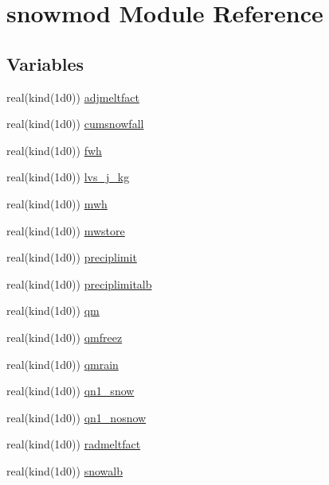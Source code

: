 \hypertarget{namespacesnowmod}{}\section{snowmod Module Reference}
\label{namespacesnowmod}
\subsection*{Variables}
\begin{DoxyCompactItemize}
\item 
real(kind(1d0)) \hyperlink{namespacesnowmod_a5c337bba47f88549ed03afb42d5d097d}{adjmeltfact}
\item 
real(kind(1d0)) \hyperlink{namespacesnowmod_a78e0393f653cfdebf0ccab83abc0b800}{cumsnowfall}
\item 
real(kind(1d0)) \hyperlink{namespacesnowmod_a67018a3202a62ad0d4e7715dbfcf5e50}{fwh}
\item 
real(kind(1d0)) \hyperlink{namespacesnowmod_aa988f82274f056c6d2f7ed3d37457b24}{lvs\+\_\+j\+\_\+kg}
\item 
real(kind(1d0)) \hyperlink{namespacesnowmod_a7e8123e5b32bedfb676ea5c6ca62272a}{mwh}
\item 
real(kind(1d0)) \hyperlink{namespacesnowmod_affe56e4e5f1d5df5d7f4bbae7ae22541}{mwstore}
\item 
real(kind(1d0)) \hyperlink{namespacesnowmod_a9e24791cb966600bc8e20739bc1f36b3}{preciplimit}
\item 
real(kind(1d0)) \hyperlink{namespacesnowmod_a5dcda7794eeea3753a3f14cd6fdf47b8}{preciplimitalb}
\item 
real(kind(1d0)) \hyperlink{namespacesnowmod_a1d7e7d0b8974783e0320cde393e09594}{qm}
\item 
real(kind(1d0)) \hyperlink{namespacesnowmod_adbb58215814d438f2486f880958737be}{qmfreez}
\item 
real(kind(1d0)) \hyperlink{namespacesnowmod_a35fe883b6ebd9767f44c27354160afd3}{qmrain}
\item 
real(kind(1d0)) \hyperlink{namespacesnowmod_ad0e97f4f3c91c80ab519eab77750a5c0}{qn1\+\_\+snow}
\item 
real(kind(1d0)) \hyperlink{namespacesnowmod_adfca55100f9a2262f228ea1e39d61271}{qn1\+\_\+nosnow}
\item 
real(kind(1d0)) \hyperlink{namespacesnowmod_abb043edcfd004e81969e16e07ed0d646}{radmeltfact}
\item 
real(kind(1d0)) \hyperlink{namespacesnowmod_a269fc9eb4dcd8dc77888c370c046a3c2}{snowalb}
\item 

\end{DoxyCompactItemize}
